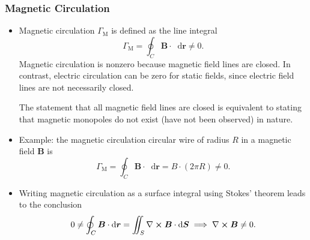 \documentclass[11pt, a4paper]{article}
\newcommand{\diff}{\mathop{}\!\mathrm{d}} %
\renewcommand{\vec}[1]{\bm{#1}} %
\renewcommand{\r}{\vec{r}}
\newcommand{\B}{\vec{B}} %
\renewcommand{\curl}{\nabla \cross}
\begin{document}
\subsubsection{Magnetic Circulation}
\begin{itemize}
	\item Magnetic circulation $ \Gamma_{\text{M}} $ is defined as the line integral
	\begin{equation*}
		\Gamma_{\text{M}} = \oint_{C}\B \cdot \diff \r \neq 0.
	\end{equation*}
	Magnetic circulation is nonzero because magnetic field lines are closed. In contrast, electric circulation can be zero for static fields, since electric field lines are not necessarily closed.
	
	The statement that all magnetic field lines are closed is equivalent to stating that magnetic monopoles do not exist (have not been observed) in nature.
	
	\item Example: the magnetic circulation circular wire of radius $ R $ in a magnetic field $ \B $ is
	\begin{equation*}
		\Gamma_{\text{M}} = \oint_{C}\B \cdot \diff \r = B \cdot (2\pi R) \neq 0.
	\end{equation*}
	
	\item Writing magnetic circulation as a surface integral using Stokes' theorem leads to the conclusion
	\begin{equation*}
		0 \neq \oint_{C}\B \cdot \diff \r = \iint_{S} \curl \B \cdot \diff \vec{S} \implies \curl \B \neq 0.
	\end{equation*}
	
\end{itemize}
\end{document}
